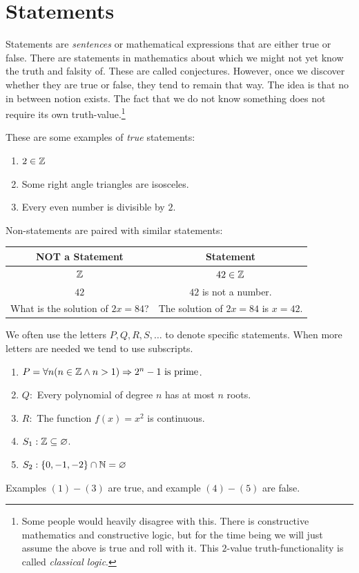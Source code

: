
\section{Statements}
Statements are \emph{sentences} or mathematical expressions that are either true or false. There are statements in mathematics about which we might not yet know the truth and falsity of. These are called conjectures. However, once we discover whether they are true or false, they tend to remain that way. The idea is that no in between notion exists. The fact that we do not know something does not require its own truth-value.\footnote{ Some people would heavily disagree with this. There is constructive mathematics and constructive logic, but for the time being we will just assume the above is true and roll with it. This $2$-value truth-functionality is called \emph{classical logic}.}

\begin{example}
    These are some examples of \emph{true} statements: 
    \begin{enumerate}
        \item $2\in\mathbb{Z}$
        \item Some right angle triangles are isosceles.
        \item Every even number is divisible by $2$.  
    \end{enumerate}
\end{example}

\begin{example}
    Non-statements are paired with similar statements:
    \begin{table}[H]
        \centering
        \begin{tabular}{cc}
            \toprule
             NOT a Statement & Statement\\
             \midrule
            $\mathbb{Z}$ & $42\in\mathbb{Z}$\\
            $42$ & $42$ is not a number. \\
            What is the solution of $2x=84$? & The  solution of $2x=84$ is $x=42$.\\
            \bottomrule
        \end{tabular}
    \end{table}
\end{example}

\begin{example}
    We often use the letters $P,Q,R,S,\dots$ to denote specific statements. When more letters are needed we tend to use subscripts. 
    \begin{enumerate}
        \item $P=\forall n(n\in\mathbb{Z} \land n > 1)\Rightarrow 2^{n}-1 \text{ is prime}$. 
        \item $Q: $ Every polynomial of degree $n$ has at most $n$ roots. 
        \item $R:$ The function $f(x)=x^2$ is continuous. 
        \item $S_1: \mathbb{Z}\subseteq\varnothing$. 
        \item $S_2: \{ 0,-1,-2 \}\cap\mathbb{N}=\varnothing$
    \end{enumerate}
    Examples $(1)-(3)$ are true, and example $(4)-(5)$ are false.
\end{example}

